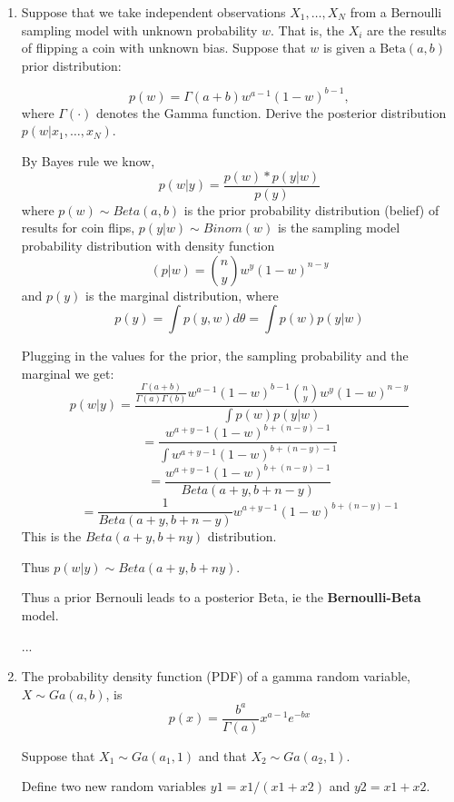 \documentclass{homework}
\begin{document}
\begin{enumerate}[label=(\Alph*)]
\item Suppose that we take independent observations $X_1, \dots , X_N$ from a Bernoulli sampling model with unknown probability $w$. That is, the $X_i$ are the results of flipping a coin with unknown bias. Suppose that $w$ is given a $\text{Beta}(a,b)$ prior distribution:


$$p(w) = \Gamma(a + b) w^{a-1} (1 - w)^{b-1},$$
where $\Gamma(\cdot)$ denotes the Gamma function. Derive the posterior distribution $p(w | x_1,\dots,x_N)$.

By Bayes rule we know, 
$$p(w | y) = \frac{p(w) * p(y | w )}{p(y)}$$ 
where $p(w)  \sim Beta(a,b)$ is the prior probability distribution (belief) of results for coin flips, 
$p(y | w) \sim Binom(w) $ is the sampling model probability distribution with density function 
$$(p | w) = {n\choose y}w^{y}(1 - w)^{n - y}$$
 and $p(y)$ is the marginal distribution, where 
 $$p(y) = \int p(y,w)  d\theta = \int p(w)p(y|w)$$
 
 Plugging in the values for the prior, the sampling probability and the marginal we get: 
 $$p(w | y) = \frac{ \frac{ \Gamma(a+b)}{ \Gamma(a) \Gamma(b) } w^{a-1} (1 - w )^{b-1} {n\choose y}w^{y}(1 - w)^{n - y} }{ \int p(w)p(y|w)}$$
$$ = \frac{ w^{a + y -1}( 1 - w )^{b + (n - y ) -1 }}{ \int w^{a + y -1}(1 - w)^{b + (n - y ) - 1}}$$
$$ = \frac{ w^{a + y -1}( 1 - w )^{b + (n - y ) -1 }}{ Beta(a + y, b + n - y) }$$
$$ = \frac{1}{ Beta(a + y, b + n - y) } w^{a + y -1}( 1 - w )^{b + (n - y ) -1 }$$
This is the $Beta(a + y, b + n   y)$ distribution. \par
Thus $p(w|y) \sim Beta(a+y,b+n y)$.\par
Thus a prior Bernouli leads to a posterior Beta, ie the \textbf{Bernoulli-Beta} model.
\par ...


\item The probability density function (PDF) of a gamma random variable, $X \sim Ga(a, b)$, is 
$$ p(x) = \frac{ b^{a}}{\Gamma(a)}x^{a-1}e^{-bx}$$

Suppose that $X_{1} \sim Ga(a_1, 1)$ and that $X_{2} \sim Ga(a_2, 1)$.  \par \noindent Define two new random variables $y1 = x1/(x1 + x2)$ and $y2 = x1 + x2$. 


\end{enumerate}
\end{document}
